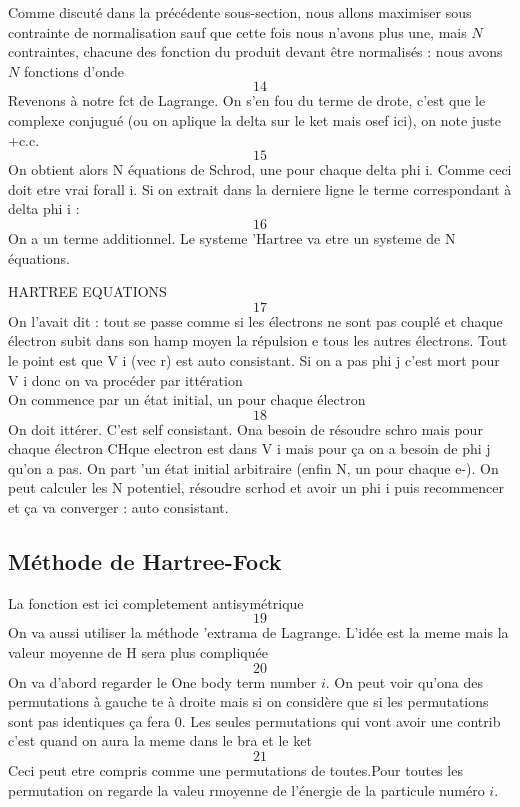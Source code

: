 Comme discuté dans la précédente sous-section, nous allons maximiser sous contrainte de 
normalisation sauf que cette fois nous n'avons plus une, mais $N$ contraintes, chacune 
des fonction du produit devant être normalisés :  nous avons $N$ fonctions d'onde
\begin{equation}
14
\end{equation}
Revenons à notre fct de Lagrange. On s'en fou du terme de drote, c'est que le complexe conjugué (ou on 
aplique la delta sur le ket mais osef ici), on note juste +c.c.
\begin{equation}
15
\end{equation}
On obtient alors N équations de Schrod, une pour chaque delta phi i. Comme ceci doit etre vrai forall i. 
Si on extrait dans la derniere ligne le terme correspondant à delta phi i :
\begin{equation}
16
\end{equation}
On a un terme additionnel. Le systeme 'Hartree va etre un systeme de N équations.

HARTREE EQUATIONS
\begin{equation}
17
\end{equation}
On l'avait dit : tout se passe comme si les électrons ne sont pas couplé et chaque électron subit 
dans son hamp moyen la répulsion e tous les autres électrons. Tout le point est que V i (vec r) 
est auto consistant. Si on a pas phi j c'est mort pour V i donc on va procéder par ittération\\

On commence par un état initial, un pour chaque électron
\begin{equation}
18
\end{equation}
On doit ittérer. C'est self consistant. Ona besoin de résoudre schro mais pour chaque électron CHque 
electron est dans V i mais pour ça on a besoin de phi j qu'on a pas. On part 'un état initial arbitraire (enfin N, un pour chaque e-). On peut calculer les N potentiel, résoudre scrhod et avoir un phi i puis recommencer et ça va converger : auto consistant.


\subsection{Méthode de Hartree-Fock}
La fonction est ici completement antisymétrique
\begin{equation}
19
\end{equation}
On va aussi utiliser la méthode 'extrama de Lagrange. L'idée est la meme mais la valeur moyenne de H sera plus compliquée
\begin{equation}
20
\end{equation}
On va d'abord regarder le One body term number $i$. On peut voir qu'ona des permutations à gauche te à droite mais si on 
considère que si les permutations sont pas identiques ça fera 0. Les seules permutations qui vont avoir une contrib c'est
quand on aura la meme dans le bra et le ket
\begin{equation}
21
\end{equation}
Ceci peut etre compris comme une permutations de toutes.Pour toutes les permutation on regarde la valeu rmoyenne de l'énergie 
de la particule numéro $i$. \\

